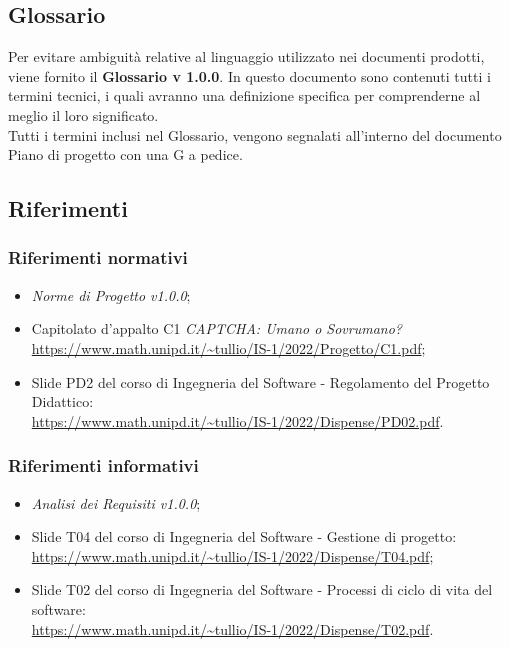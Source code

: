 \subsection{Glossario}
Per evitare ambiguità relative al linguaggio utilizzato nei documenti prodotti, viene fornito il \textbf{Glossario v 1.0.0}. In questo documento sono contenuti tutti i termini tecnici, i quali avranno una definizione specifica per comprenderne al meglio il loro significato.\\
Tutti i termini inclusi nel Glossario, vengono segnalati all'interno del documento Piano di progetto con una G a pedice.

\subsection{Riferimenti}

\subsubsection{Riferimenti normativi}\:
\begin{itemize}
	\item \textit{Norme di Progetto v1.0.0};
	\item Capitolato d'appalto C1 \textit{CAPTCHA: Umano o Sovrumano?}\\
		\url{https://www.math.unipd.it/~tullio/IS-1/2022/Progetto/C1.pdf};
	\item Slide PD2 del corso di Ingegneria del Software - Regolamento del Progetto Didattico:\\
		\url{https://www.math.unipd.it/~tullio/IS-1/2022/Dispense/PD02.pdf}.
\end{itemize}

\subsubsection{Riferimenti informativi}\:
\begin{itemize}
	\item \textit{Analisi dei Requisiti v1.0.0};
	\item Slide T04 del corso di Ingegneria del Software - Gestione di progetto:\\
		\url{https://www.math.unipd.it/~tullio/IS-1/2022/Dispense/T04.pdf};
	\item Slide T02 del corso di Ingegneria del Software - Processi di ciclo di vita del software:\\
		\url{https://www.math.unipd.it/~tullio/IS-1/2022/Dispense/T02.pdf}.
\end{itemize}



